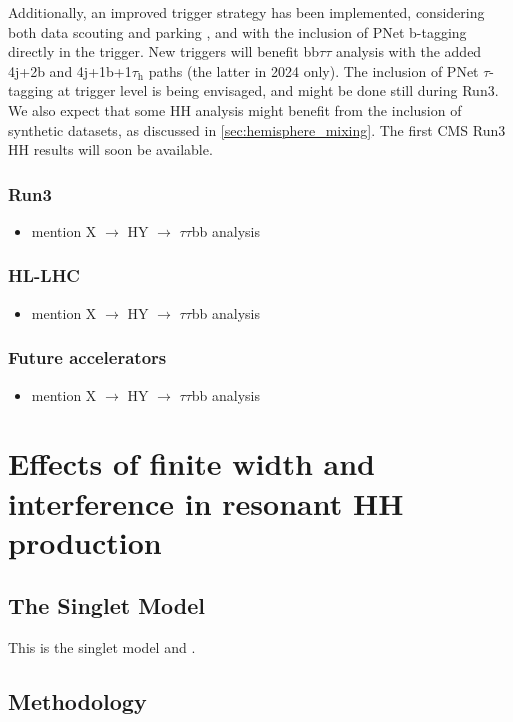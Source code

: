 \documentclass[11pt]{article}
\newcommand{\bbtt}{bb$\tau\tau$}
\newcommand{\reshybbtt}{X $\rightarrow$ HY $\rightarrow$ $\tau\tau$bb}
\newcommand{\tauh}{$\tau_{\text{h}}$}
\begin{document}
Additionally, an improved trigger strategy has been implemented, considering both data scouting and parking \cite{parking_scouting_run3_cms}, and with the inclusion of \ac{PNet} b-tagging directly in the trigger.
New triggers will benefit \bbtt{} analysis with the added 4j+2b and 4j+1b+1\tauh{} paths (the latter in 2024 only).
The inclusion of \ac{PNet} \(\tau\)-tagging at trigger level is being envisaged, and might be done still during Run3.
We also expect that some HH analysis might benefit from the inclusion of synthetic datasets, as discussed in \cref{sec:hemisphere_mixing}.
The first \ac{CMS} Run3 HH results will soon be available.
\subsubsection{Run3}
\label{sec:org1e98136}
\begin{itemize}
\item mention \reshybbtt{} analysis
\end{itemize}
\subsubsection{HL-LHC}
\label{sec:org3947dc0}
\begin{itemize}
\item mention \reshybbtt{} analysis
\end{itemize}
\subsubsection{Future accelerators}
\label{sec:org66fc6b3}
\begin{itemize}
\item mention \reshybbtt{} analysis
\end{itemize}
\section{Effects of finite width and interference in resonant HH production}
\label{sec:orgfbcdceb}
\subsection{The Singlet Model}
\label{sec:orgffc221e}
\label{sec::SingletModel}

This is the singlet model \cite{jona_soutenance} and \cite{hgcal_tdr}.
\subsection{Methodology}
\label{sec:orgd7efbd9}
\end{document}
